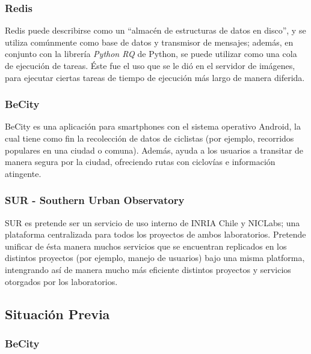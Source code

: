 \documentclass[11pt,letterpaper]{article}
\begin{document}
\subsubsection{Redis}

Redis\cite{redis} puede describirse como un ``almacén de estructuras de datos en disco'', y se utiliza comúnmente como base de datos y transmisor de mensajes; además, en conjunto con la librería \emph{Python RQ}\cite{rqworker} de Python, se puede utilizar como una cola de ejecución de tareas. Éste fue el uso que se le dió en el servidor de imágenes, para ejecutar ciertas tareas de tiempo de ejecución más largo de manera diferida.

\subsubsection{BeCity}

BeCity es una aplicación para smartphones con el sistema operativo Android, la cual tiene como fin la recolección de datos de ciclistas (por ejemplo, recorridos populares en una ciudad o comuna). Además, ayuda a los usuarios a transitar de manera segura por la ciudad, ofreciendo rutas con ciclovías e información atingente.

\subsubsection{SUR - Southern Urban Observatory}

SUR es pretende ser un servicio de uso interno de INRIA Chile y NICLabs; una plataforma centralizada para todos los proyectos de ambos laboratorios. Pretende unificar de ésta manera muchos servicios que se encuentran replicados en los distintos proyectos (por ejemplo, manejo de usuarios) bajo una misma platforma, intengrando así de manera mucho más eficiente distintos proyectos y servicios otorgados por los laboratorios.

\subsection{Situación Previa}
\subsubsection{BeCity}
\end{document}
